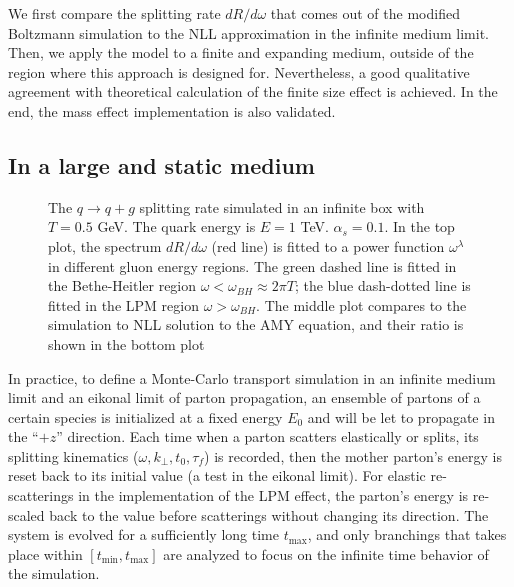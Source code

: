 We first compare the splitting rate $dR/d\omega$ that comes out of the modified Boltzmann simulation to the NLL approximation in the infinite medium limit.
Then, we apply the model to a finite and expanding medium, outside of the region where this approach is designed for.
Nevertheless, a good qualitative agreement with theoretical calculation of the finite size effect is achieved.
In the end, the mass effect implementation is also validated.

\subsection{In a large and static medium}
\begin{figure}
\singlespacing
{}
\caption[The $q\rightarrow q+g$ splitting rate simulated in an infinite box with]{The $q\rightarrow q+g$ splitting rate simulated in an infinite box with $T=0.5$ GeV. The quark energy is $E=1$ TeV. $\alpha_s = 0.1$. In the top plot, the spectrum $dR/d\omega$ (red line) is fitted to a power function $\omega^\lambda$ in different gluon energy regions. The green dashed line is fitted in the Bethe-Heitler region $\omega < \omega_{BH}\approx 2\pi T$; the blue dash-dotted line is fitted in the LPM region $\omega > \omega_{BH}$. The middle plot compares to the simulation to NLL solution to the AMY equation, and their ratio is shown in the bottom plot}
\label{fig:spectrum}
\end{figure}

In practice, to define a Monte-Carlo transport simulation in an infinite medium limit and an eikonal limit of parton propagation, an ensemble of partons of a certain species is initialized at a fixed energy $E_0$ and will be let to propagate in the ``$+z$'' direction.
Each time when a parton scatters elastically or splits, its splitting kinematics ($\omega, k_\perp, t_0, \tau_f$) is recorded, then the mother parton's energy is reset back to its initial value (a test in the eikonal limit).
For elastic re-scatterings in the implementation of the LPM effect, the parton's energy is re-scaled back to the value before scatterings without changing its direction.
The system is evolved for a sufficiently long time $t_{\max}$, and only branchings that takes place within $[t_{\min}, t_{\max}]$ are analyzed to focus on the infinite time behavior of the simulation.


